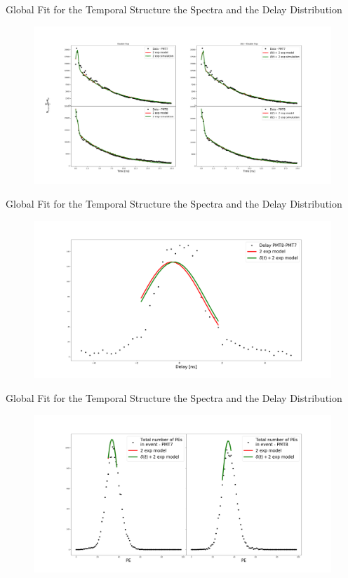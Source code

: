 \documentclass{beamer}
\begin{document}
\begin{frame}{Global Fit for the Temporal Structure the Spectra and the Delay Distribution}
\begin{figure}[h]
\includegraphics[width=1\textwidth]{fitB.png}
\end{figure}
\end{frame}

\begin{frame}{Global Fit for the Temporal Structure the Spectra and the Delay Distribution}
\begin{figure}[h]
\includegraphics[width=1\textwidth]{delay_fit1.png}
\end{figure}
\end{frame}

\begin{frame}{Global Fit for the Temporal Structure the Spectra and the Delay Distribution}
\begin{figure}[h]
\includegraphics[width=1\textwidth]{spectra_fit1.png}
\end{figure}
\end{frame}
\end{document}
